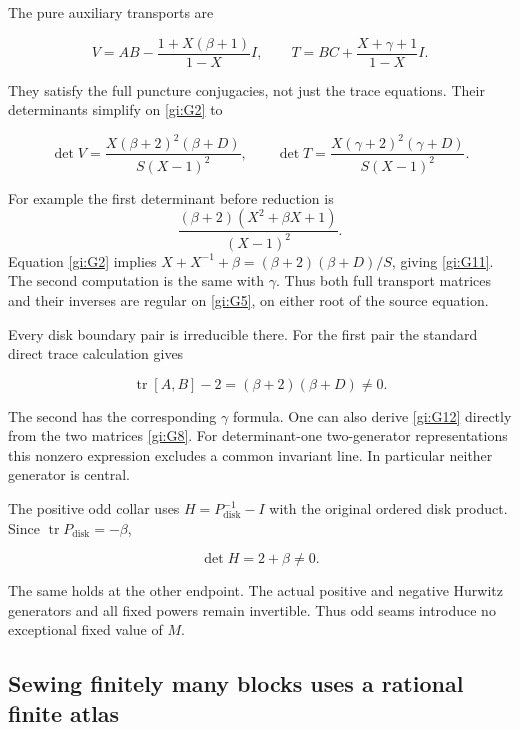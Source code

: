 The pure auxiliary transports are

\begin{equation}\label{gi:G10}
V=AB-\frac{1+X(\beta+1)}{1-X}I,\qquad
 T=BC+\frac{X+\gamma+1}{1-X}I.
\end{equation}

They satisfy the full puncture conjugacies, not just the trace
equations. Their determinants simplify on \eqref{gi:G2} to

\begin{equation}\label{gi:G11}
\det V=\frac{X(\beta+2)^2(\beta+D)}{S(X-1)^2},\qquad
 \det T=\frac{X(\gamma+2)^2(\gamma+D)}{S(X-1)^2}.
\end{equation}

For example the first determinant before reduction is
\[
 \frac{(\beta+2)(X^2+\beta X+1)}{(X-1)^2}.
\]
Equation \eqref{gi:G2} implies
\(X+X^{-1}+\beta=(\beta+2)(\beta+D)/S\), giving \eqref{gi:G11}.
The second computation is the same with \(\gamma\).
Thus both full transport matrices and their inverses are regular
on \eqref{gi:G5}, on either root of the source equation.

Every disk boundary pair is irreducible there. For the first
pair the standard direct trace calculation gives

\begin{equation}\label{gi:G12}
\operatorname{tr}[A,B]-2=(\beta+2)(\beta+D)\ne0.
\end{equation}

The second has the corresponding \(\gamma\) formula.
One can also derive \eqref{gi:G12} directly from the two matrices \eqref{gi:G8}.
For determinant-one two-generator representations this
nonzero expression excludes a common invariant line. In
particular neither generator is central.

The positive odd collar uses \(H=P_{\mathrm{disk}}^{-1}-I\)
with the original ordered disk product. Since
\(\operatorname{tr}P_{\mathrm{disk}}=-\beta\),

\begin{equation}\label{gi:G13}
\det H=2+\beta\ne0.
\end{equation}

The same holds at the other endpoint. The actual positive and
negative Hurwitz generators and all fixed powers remain
invertible. Thus odd seams introduce no exceptional fixed
value of \(M\).

\subsection{Sewing finitely many blocks uses a rational finite atlas}\label{gi:sewing-finitely-many-blocks-uses-a-rational-finite-atlas}

